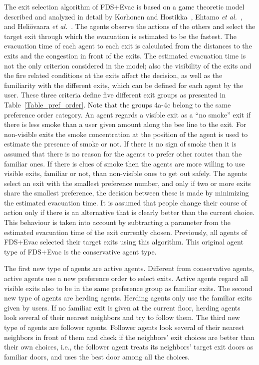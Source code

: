 \documentclass[12pt,a4paper,final,twoside]{stylevk}
\begin{document}
The exit selection algorithm of FDS+Evac is based on a game theoretic
model described and analyzed in detail by Korhonen and
Hostikka~\cite{Korhonen09}, Ehtamo \emph{et al.}~\cite{Ehtamo2010},
and Heliövaara \emph{et al.}~\cite{Heliovaara10}.  The agents observe
the actions of the others and select the target exit through which the
evacuation is estimated to be the fastest.  The evacuation time of
each agent to each exit is calculated from the distances to the exits
and the congestion in front of the exits.  The estimated evacuation
time is not the only criterion considered in the model; also the
visibility of the exits and the fire related conditions at the exits
affect the decision, as well as the familiarity with the different
exits, which can be defined for each agent by the user.  These three
criteria define five different exit groups as presented in
Table~\ref{Table_pref_order}.  Note that the groups 4a-4c belong to
the same preference order category.  An agent regards a visible exit
as a ``no smoke'' exit if there is less smoke than a user given amount
along the bee line to the exit.  For non-visible exits the smoke
concentration at the position of the agent is used to estimate the
presence of smoke or not.  If there is no sign of smoke then it is
assumed that there is no reason for the agents to prefer other routes
than the familiar ones.  If there is clues of smoke then the agents
are more willing to use visible exits, familiar or not, than
non-visible ones to get out safely.  The agents select an exit with
the smallest preference number, and only if two or more exits share
the smallest preference, the decision between these is made by
minimizing the estimated evacuation time.  It is assumed that people
change their course of action only if there is an alternative that is
clearly better than the current choice.  This behaviour is taken into
account by subtracting a parameter from the estimated evacuation time
of the exit currently chosen.  Previously, all agents of FDS+Evac
selected their target exits using this algorithm.  This original agent
type of FDS+Evac is the conservative agent type.


The first new type of agents are active agents. Different from conservative agents, active agents use a new preference order to select exits.  Active agents regard all visible exits also to be in the same preference group as familiar exits. The second new type of agents are herding agents.  Herding agents only use the familiar exits given by users. If no familiar exit is given at the current floor, herding agents look several of their nearest neighbors and try to follow them. The third new type of agents are follower agents. Follower agents look several of their nearest neighbors in front of them and check if the neighbors' exit choices are better than their own choices, i.e., the follower agent treats its neighbors’ target exit doors as familiar doors, and uses the best door among all the choices. 
\end{document}
